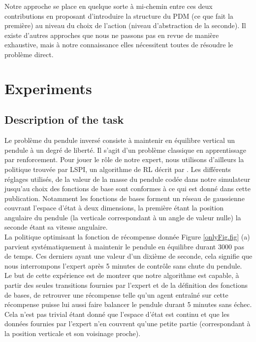 \documentclass{article}
\begin{document}
Notre approche se place en quelque sorte à mi-chemin entre ces deux contributions en proposant d'introduire la structure du PDM (ce que fait la première) au niveau du choix de l'action (niveau d'abstraction de la seconde). Il existe d'autres approches que nous ne passons pas en revue de manière exhaustive, mais à notre connaissance elles nécessitent toutes de résoudre le problème direct.
\section{Experiments}
\label{exp.sec}
\subsection{Description of the task}
Le problème du pendule inversé consiste à maintenir en équilibre vertical un pendule à un degré de liberté. Il s'agit d'un problème classique en apprentissage par renforcement. Pour jouer le rôle de notre expert, nous utilisons d'ailleurs la politique trouvée par LSPI, un algorithme de RL décrit par \citet{lagoudakis2003least}. Les différents réglages utilisés, de la valeur de la masse du pendule codée dans notre simulateur jusqu'au choix des fonctions de base sont conformes à ce qui est donné dans cette publication. Notamment les fonctions de bases forment un réseau de gaussienne couvrant l'espace d'état à deux dimensions, la première étant la position angulaire du pendule (la verticale correspondant à un angle de valeur nulle) la seconde étant sa vitesse angulaire.\\

La politique optimisant la fonction de récompense donnée Figure \ref{onlyFig.fig} (a) parvient systématiquement à maintenir le pendule en équilibre durant 3000 pas de temps. Ces derniers ayant une valeur d'un dixième de seconde, cela signifie que nous interrompons l'expert après 5 minutes de contrôle sans chute du pendule.\\

Le but de cette expérience est de montrer que notre algorithme est capable, à partir des seules transitions fournies par l'expert et de la définition des fonctions de bases, de retrouver une récompense telle qu'un agent entraîné sur cette récompense puisse lui aussi faire balancer le pendule durant 5 minutes sans échec. Cela n'est pas trivial étant donné que l'espace d'état est continu et que les données fournies par l'expert n'en couvrent qu'une petite partie (correspondant à la position verticale et son voisinage proche).\\
\end{document}
